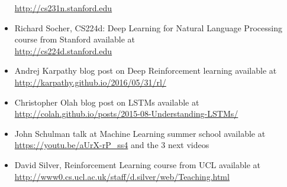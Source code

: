 \begin{itemize}
\url{http://cs231n.stanford.edu}
\item Richard Socher, CS224d: Deep Learning for Natural Language Processing course from Stanford available at \\
\url{http://cs224d.stanford.edu}
\item Andrej Karpathy blog post on Deep Reinforcement learning available at \\
\url{http://karpathy.github.io/2016/05/31/rl/}
\item Christopher Olah blog post on LSTMs available at \\
\url{http://colah.github.io/posts/2015-08-Understanding-LSTMs/}
\item John Schulman talk at Machine Learning summer school available at \\
\url{https://youtu.be/aUrX-rP_ss4} and the 3 next videos
\item David Silver, Reinforcement Learning course from UCL available at \\
\url{http://www0.cs.ucl.ac.uk/staff/d.silver/web/Teaching.html}
\end{itemize}